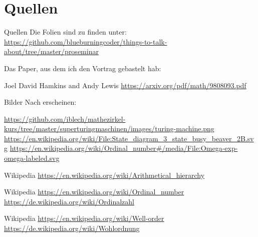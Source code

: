 \section{Quellen}
\begin{frame}{Quellen}
    Die Folien sind zu finden unter: \\
    \url{https://github.com/blueburningcoder/things-to-talk-about/tree/master/proseminar}


    Das Paper, aus dem ich den Vortrag gebastelt hab:

    \begin{thebibliography}{10}
    \beamertemplatebookbibitems
        Joel David Hamkins and Andy Lewis
        \newblock \url{https://arxiv.org/pdf/math/9808093.pdf}
        \beamertemplatearticlebibitems

        Bilder
        \newblock Nach erscheinen:

         \url{https://github.com/iblech/mathezirkel-kurs/tree/master/superturingmaschinen/images/turing-machine.png}
         \url{https://en.wikipedia.org/wiki/File:State_diagram_3_state_busy_beaver_2B.svg}
         \url{https://en.wikipedia.org/wiki/Ordinal_number#/media/File:Omega-exp-omega-labeled.svg}



        Wikipedia
        \newblock \url{https://en.wikipedia.org/wiki/Arithmetical_hierarchy}

        Wikipedia
        \newblock \url{https://en.wikipedia.org/wiki/Ordinal_number}
        \newblock \url{https://de.wikipedia.org/wiki/Ordinalzahl}

        Wikipedia
        \newblock \url{https://en.wikipedia.org/wiki/Well-order}
        \newblock \url{https://de.wikipedia.org/wiki/Wohlordnung}



\end{thebibliography}
\end{frame}

